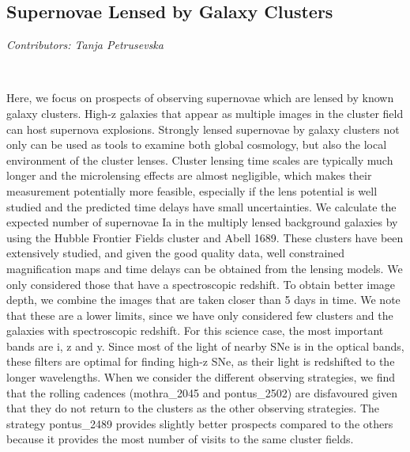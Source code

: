 \subsection{Supernovae Lensed by Galaxy Clusters}
\textit{Contributors: Tanja Petrusevska}

\

Here, we focus on prospects of observing supernovae which are
lensed by known galaxy clusters. High-z galaxies that appear as
multiple images in the cluster field can host supernova
explosions. Strongly lensed supernovae by galaxy clusters not only
can be used as tools to examine both global cosmology, but also
the local environment of the cluster lenses. Cluster lensing time
scales are typically much longer and the microlensing effects are
almost negligible, which makes their measurement potentially more
feasible, especially if the lens potential is well studied and the
predicted time delays have small uncertainties. We calculate the
expected number of supernovae Ia in the multiply lensed background
galaxies by using the Hubble Frontier Fields cluster and Abell
1689. These clusters have been extensively studied, and given the
good quality data, well constrained magnification maps and time
delays can be obtained from the lensing models. We only considered
those that have a spectroscopic redshift. To obtain better image
depth, we combine the images that are taken closer than 5 days in
time. We note that these are a lower limits, since we have only
considered few clusters and the galaxies with spectroscopic
redshift. For this science case, the most important bands are i, z
and y. Since most of the light of nearby SNe is in the optical
bands, these filters are optimal for finding high-z SNe, as their
light is redshifted to the longer wavelengths. When we consider
the different observing strategies, we find that the rolling
cadences (mothra\_2045 and pontus\_2502) are disfavoured given that
they do not return to the clusters as the other observing
strategies. The strategy pontus\_2489 provides slightly better
prospects compared to the others because it provides the most
number of visits to the same cluster fields.

